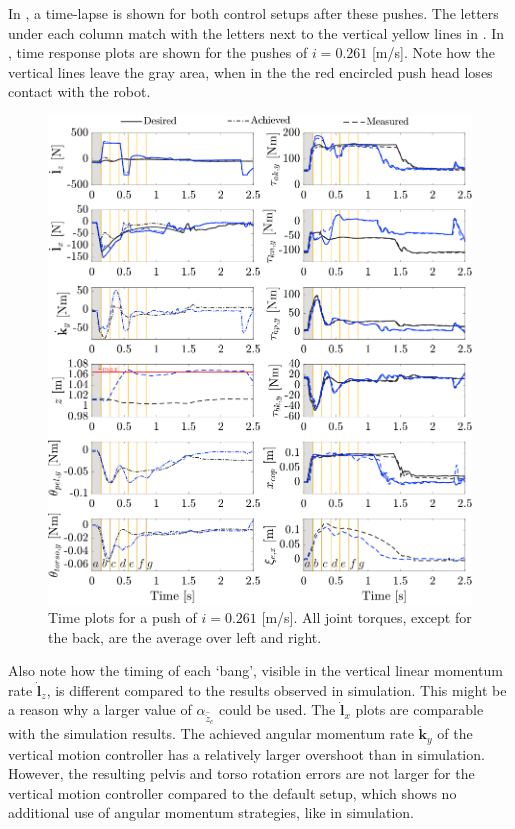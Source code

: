 In , a time-lapse is shown for both control setups after these pushes. The letters under each column match with the letters next to the vertical yellow lines in . In , time response plots are shown for the pushes of $i=0.261$ [m/s]. Note how the vertical lines leave the gray area, when in the  the red encircled push head loses contact with the robot. 
\begin{figure}
\centering
\includegraphics[width=1.0\textwidth]{STYLESTUFF/valcomparetimeHW.png}
\caption{Time plots for a push of $i=0.261$ [m/s]. All joint torques, except for the back, are the average over left and right.}
\label{fig:valcomparetimeHW}
\end{figure}

Also note how the timing of each `bang', visible in the vertical linear momentum rate $\dot{\mathbf{l}}_z$, is different compared to the results observed in simulation. This might be a reason why a larger value of $\alpha_{\hat{\ddot{z}}_{c}}$ could be used. The $\dot{\mathbf{l}}_x$ plots are comparable with the simulation results. The achieved angular momentum rate $\dot{\mathbf{k}}_y$ of the vertical motion controller has a relatively larger overshoot than in simulation. However, the resulting pelvis and torso rotation errors are not larger for the vertical motion controller compared to the default setup, which shows no additional use of angular momentum strategies, like in simulation. 


